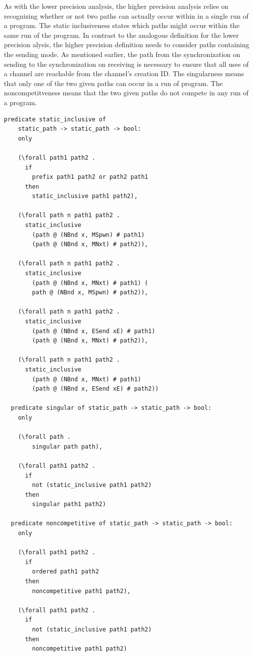 \documentclass[10pt]{article}
\begin{document}
As with the lower precision analysis, the higher precision analysis relies on recognizing
whether or not two paths can actually occur within in a single run of a program. The static
inclusiveness states which paths might occur within the same run of the program.
In contrast to the analogous definition for the lower precision
alysis, the higher precision definition needs to consider paths containing the
sending mode.  As mentioned earlier, the path from the synchronization on sending to the
synchronization on receiving is necessary to ensure that all uses of a channel are reachable
from the channel's creation ID.  The singularness means that only one of the two
given paths can occur in a run of program.  The noncompetitveness means that the two
given paths do not compete in any run of a program. 

\begin{lstlisting}[language=logic, mathescape]
  predicate static_inclusive of
    static_path -> static_path -> bool:
    only

    (\forall path1 path2 .
      if
        prefix path1 path2 or path2 path1
      then
        static_inclusive path1 path2),

    (\forall path n path1 path2 .
      static_inclusive
        (path @ (NBnd x, MSpwn) # path1)
        (path @ (NBnd x, MNxt) # path2)),

    (\forall path n path1 path2 .
      static_inclusive
        (path @ (NBnd x, MNxt) # path1) (
        path @ (NBnd x, MSpwn) # path2)),

    (\forall path n path1 path2 .
      static_inclusive
        (path @ (NBnd x, ESend xE) # path1)
        (path @ (NBnd x, MNxt) # path2)),

    (\forall path n path1 path2 .
      static_inclusive
        (path @ (NBnd x, MNxt) # path1)
        (path @ (NBnd x, ESend xE) # path2))

  predicate singular of static_path -> static_path -> bool:
    only 

    (\forall path .
        singular path path),

    (\forall path1 path2 .
      if
        not (static_inclusive path1 path2)
      then
        singular path1 path2)

  predicate noncompetitive of static_path -> static_path -> bool:
    only

    (\forall path1 path2 . 
      if
        ordered path1 path2
      then
        noncompetitive path1 path2),

    (\forall path1 path2 .
      if
        not (static_inclusive path1 path2)
      then
        noncompetitive path1 path2)
  \end{lstlisting}
\end{document}
